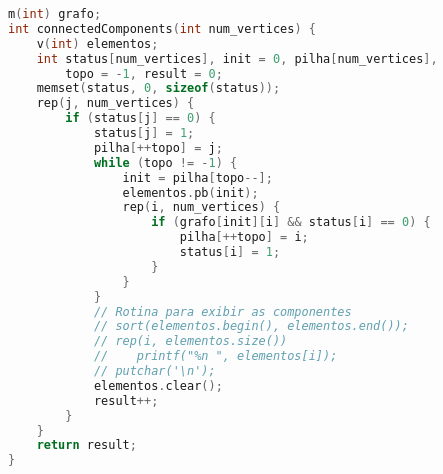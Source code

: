 \begin{lstlisting}[language=C++]
m(int) grafo;
int connectedComponents(int num_vertices) {
	v(int) elementos;
	int status[num_vertices], init = 0, pilha[num_vertices], 
	    topo = -1, result = 0;
    memset(status, 0, sizeof(status));
	rep(j, num_vertices) {
		if (status[j] == 0) {
			status[j] = 1;
			pilha[++topo] = j;
			while (topo != -1) {
				init = pilha[topo--];
				elementos.pb(init);
				rep(i, num_vertices) {
					if (grafo[init][i] && status[i] == 0) {
						pilha[++topo] = i;
						status[i] = 1;
					}
				}
			}
			// Rotina para exibir as componentes
            // sort(elementos.begin(), elementos.end());
			// rep(i, elementos.size())
			//    printf("%n ", elementos[i]);
			// putchar('\n');
            elementos.clear();
			result++;
		}
	}
	return result;
}
\end{lstlisting}